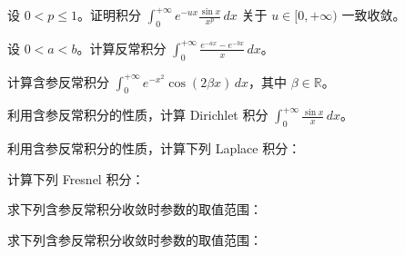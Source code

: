 \noindent\begin{minipage}{\textwidth}
设 $0<p\le1$。证明积分 $\displaystyle\int_0^{+\infty}e^{-ux}\frac{\sin x}{x^p}\,dx$ 关于 $u\in[0,+\infty)$ 一致收敛。
\end{minipage}\par\vfill
\noindent\begin{minipage}{\textwidth}
设 $0<a<b$。计算反常积分 $\displaystyle\int_0^{+\infty}\frac{e^{-ax}-e^{-bx}}x\,dx$。
\end{minipage}\par\vfill
\noindent\begin{minipage}{\textwidth}
计算含参反常积分 $\displaystyle\int_0^{+\infty}e^{-x^2}\cos(2\beta x)\,dx$，其中 $\beta\in\mathbb R$。
\end{minipage}\par\vfill
\newpage
\noindent\begin{minipage}{\textwidth}
利用含参反常积分的性质，计算 Dirichlet 积分 $\displaystyle\int_0^{+\infty}\frac{\sin x}{x}\,dx$。
\end{minipage}\par\vfill
\noindent\begin{minipage}{\textwidth}
利用含参反常积分的性质，计算下列 Laplace 积分：
\end{minipage}\par\vfill
\noindent\begin{minipage}{\textwidth}
计算下列 Fresnel 积分：
\end{minipage}\par\vfill
\noindent\begin{minipage}{\textwidth}
求下列含参反常积分收敛时参数的取值范围：
\end{minipage}\par\vfill
\newpage
\noindent\begin{minipage}{\textwidth}
求下列含参反常积分收敛时参数的取值范围：
\end{minipage}\par\vfill
